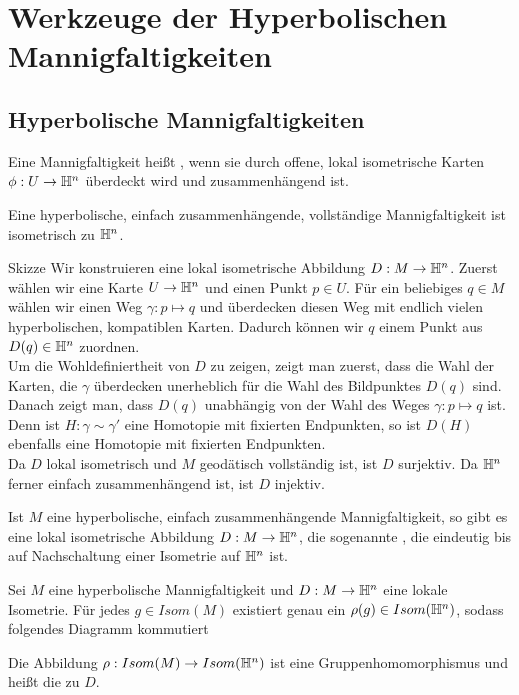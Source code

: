 \documentclass{book}
\begin{document}
\chapter{Werkzeuge der Hyperbolischen Mannigfaltigkeiten}
\section{Hyperbolische Mannigfaltigkeiten}
\Def{}
Eine Mannigfaltigkeit heißt , wenn sie durch offene, lokal isometrische Karten $\phi : U \overset{}{\rightarrow} \mathbb{H}^n$ überdeckt wird und zusammenhängend ist.

\Satz{}
Eine hyperbolische, einfach zusammenhängende, vollständige Mannigfaltigkeit ist isometrisch zu $\mathbb{H}^n$.
\begin{Beweis}{Skizze}
	Wir konstruieren eine lokal isometrische Abbildung $D : M \overset{}{\rightarrow} \mathbb{H}^n$. Zuerst wählen wir eine Karte $ U \overset{}{\rightarrow} \mathbb{H}^n$ und einen Punkt $p \in U$. Für ein beliebiges $q \in M$ wählen wir einen Weg $\gamma : p \mapsto q$ und überdecken diesen Weg mit endlich vielen hyperbolischen, kompatiblen Karten. Dadurch können wir $q$ einem Punkt aus $D(q) \in \mathbb{H}^n$ zuordnen.\\
	Um die Wohldefiniertheit von $D$ zu zeigen, zeigt man zuerst, dass die Wahl der Karten, die $\gamma$ überdecken unerheblich für die Wahl des Bildpunktes $D(q)$ sind.\\
	Danach zeigt man, dass $D(q)$ unabhängig von der Wahl des Weges $\gamma:p\mapsto q$ ist. Denn ist $H : \gamma \sim \gamma'$ eine Homotopie mit fixierten Endpunkten, so ist $D(H)$ ebenfalls eine Homotopie mit fixierten Endpunkten.\\
	Da $D$ lokal isometrisch und $M$ geodätisch vollständig ist, ist $D$ surjektiv. Da $\mathbb{H}^n$ ferner einfach zusammenhängend ist, ist $D$ injektiv. 
\end{Beweis}

\Kor{}
Ist $M$ eine hyperbolische, einfach zusammenhängende Mannigfaltigkeit, so gibt es eine lokal isometrische Abbildung $D : M \overset{}{\rightarrow} \mathbb{H}^n$, die sogenannte , die eindeutig bis auf Nachschaltung einer Isometrie auf $\mathbb{H}^n$ ist.

\newpage
\Prop{}
Sei $M$ eine hyperbolische Mannigfaltigkeit und $D : M \overset{}{\rightarrow} \mathbb{H}^n$ eine lokale Isometrie. Für jedes $g\in Isom(M)$ existiert genau ein $\rho(g) \in Isom(\mathbb{H}^n)$, sodass folgendes Diagramm kommutiert
\begin{center}
\end{center}
Die Abbildung $\rho : Isom(M) \overset{}{\rightarrow} Isom(\mathbb{H}^n)$ ist eine Gruppenhomomorphismus und heißt die  zu $D$.
\end{document}
